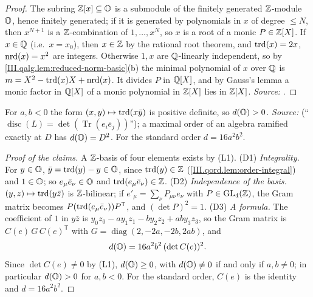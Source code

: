 \begin{lemma}
\end{lemma}
\begin{proof}
The subring $\mathbb{Z}[x]\subseteq\mathbb{O}$ is a submodule of the finitely generated $\mathbb{Z}$-module $\mathbb{O}$, hence finitely generated; if it is generated by
polynomials in $x$ of degree $\le N$, then $x^{N+1}$ is a $\mathbb{Z}$-combination of $1,\dots,x^N$, so $x$ is a root of a monic $P\in\mathbb{Z}[X]$. If $x\in\mathbb{Q}$ (i.e.\
$x=x_0$), then $x\in\mathbb{Z}$ by the rational root theorem, and $\operatorname{trd}(x)=2x$, $\operatorname{nrd}(x)=x^2$ are integers. Otherwise $1,x$ are $\mathbb{Q}$-linearly independent, so by
\cref{III.qalg.lem:reduced-norm-basic}(b) the minimal polynomial of $x$ over $\mathbb{Q}$ is $m=X^2-\operatorname{trd}(x)X+\operatorname{nrd}(x)$. It divides $P$ in $\mathbb{Q}[X]$, and by Gauss's lemma
a monic factor in $\mathbb{Q}[X]$ of a monic polynomial in $\mathbb{Z}[X]$ lies in $\mathbb{Z}[X]$. \emph{Source:} \cite[§10.3]{Voi}.
\end{proof}

\begin{definition}[discriminant]
\end{definition}
\noindent For $a,b<0$ the form $(x,y)\mapsto\operatorname{trd}(x\bar y)$ is positive definite, so $d(\mathbb{O})>0$. \emph{Source:} \cite[Prop.~1.1, p.~344]{Piz}
(``$\operatorname{disc}(L)=\det(\operatorname{Tr}(e_i\bar e_j))$''); a maximal order of an algebra ramified exactly at $D$ has $d(\mathbb{O})=D^2$. For the
standard order $d=16a^2b^2$.
\begin{proof}[Proof of the claims]
A $\mathbb{Z}$-basis of four elements exists by (L1). (D1) \emph{Integrality.} For $y\in\mathbb{O}$, $\bar y=\operatorname{trd}(y)-y\in\mathbb{O}$, since $\operatorname{trd}(y)\in\mathbb{Z}$
(\cref{III.qord.lem:order-integral}) and $1\in\mathbb{O}$; so $e_\mu\bar e_\nu\in\mathbb{O}$ and $\operatorname{trd}(e_\mu\bar e_\nu)\in\mathbb{Z}$. (D2) \emph{Independence of the basis.}
$(y,z)\mapsto\operatorname{trd}(y\bar z)$ is $\mathbb{Z}$-bilinear; if $e'_\mu=\sum_\nu P_{\mu\nu}e_\nu$ with $P\in\mathrm{GL}_4(\mathbb{Z})$, the Gram matrix becomes
$P(\operatorname{trd}(e_\mu\bar e_\nu))P^{\mathsf T}$, and $(\det P)^2=1$. (D3) \emph{A formula.} The coefficient of $1$ in $y\bar z$ is
$y_0z_0-ay_1z_1-by_2z_2+aby_3z_3$, so the Gram matrix is $C(e)\,G\,C(e)^{\mathsf T}$ with $G=\operatorname{diag}(2,-2a,-2b,2ab)$, and
\[
  d(\mathbb{O})=16a^2b^2\,(\det C(e))^2 .
\]
Since $\det C(e)\ne0$ by (L1), $d(\mathbb{O})\ge0$, with $d(\mathbb{O})\ne0$ if and only if $a,b\ne0$; in particular $d(\mathbb{O})>0$ for $a,b<0$. For the standard
order, $C(e)$ is the identity and $d=16a^2b^2$.
\end{proof}

